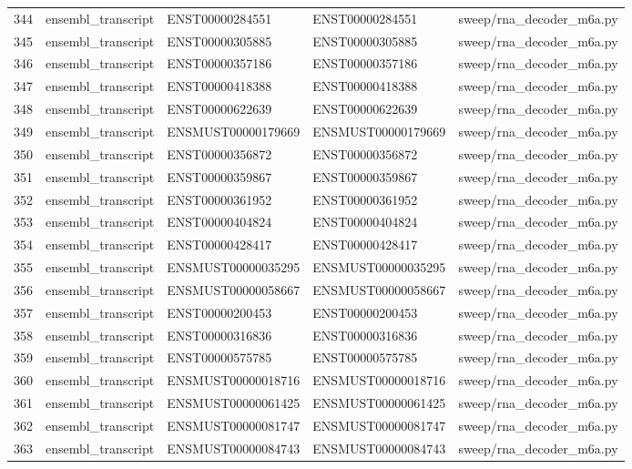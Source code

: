{\begin{longtable}{rllp{3.2cm}p{4.2cm}}
344 & ensembl\_transcript & ENST00000284551 & ENST00000284551 & sweep/rna\_decoder\_m6a.py\\
345 & ensembl\_transcript & ENST00000305885 & ENST00000305885 & sweep/rna\_decoder\_m6a.py\\
346 & ensembl\_transcript & ENST00000357186 & ENST00000357186 & sweep/rna\_decoder\_m6a.py\\
347 & ensembl\_transcript & ENST00000418388 & ENST00000418388 & sweep/rna\_decoder\_m6a.py\\
348 & ensembl\_transcript & ENST00000622639 & ENST00000622639 & sweep/rna\_decoder\_m6a.py\\
349 & ensembl\_transcript & ENSMUST00000179669 & ENSMUST00000179669 & sweep/rna\_decoder\_m6a.py\\
350 & ensembl\_transcript & ENST00000356872 & ENST00000356872 & sweep/rna\_decoder\_m6a.py\\
351 & ensembl\_transcript & ENST00000359867 & ENST00000359867 & sweep/rna\_decoder\_m6a.py\\
352 & ensembl\_transcript & ENST00000361952 & ENST00000361952 & sweep/rna\_decoder\_m6a.py\\
353 & ensembl\_transcript & ENST00000404824 & ENST00000404824 & sweep/rna\_decoder\_m6a.py\\
354 & ensembl\_transcript & ENST00000428417 & ENST00000428417 & sweep/rna\_decoder\_m6a.py\\
355 & ensembl\_transcript & ENSMUST00000035295 & ENSMUST00000035295 & sweep/rna\_decoder\_m6a.py\\
356 & ensembl\_transcript & ENSMUST00000058667 & ENSMUST00000058667 & sweep/rna\_decoder\_m6a.py\\
357 & ensembl\_transcript & ENST00000200453 & ENST00000200453 & sweep/rna\_decoder\_m6a.py\\
358 & ensembl\_transcript & ENST00000316836 & ENST00000316836 & sweep/rna\_decoder\_m6a.py\\
359 & ensembl\_transcript & ENST00000575785 & ENST00000575785 & sweep/rna\_decoder\_m6a.py\\
360 & ensembl\_transcript & ENSMUST00000018716 & ENSMUST00000018716 & sweep/rna\_decoder\_m6a.py\\
361 & ensembl\_transcript & ENSMUST00000061425 & ENSMUST00000061425 & sweep/rna\_decoder\_m6a.py\\
362 & ensembl\_transcript & ENSMUST00000081747 & ENSMUST00000081747 & sweep/rna\_decoder\_m6a.py\\
363 & ensembl\_transcript & ENSMUST00000084743 & ENSMUST00000084743 & sweep/rna\_decoder\_m6a.py\\

\end{longtable}}
